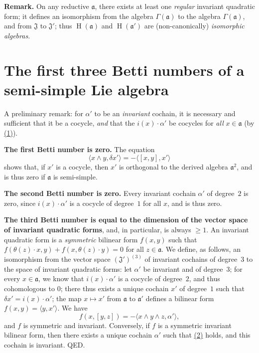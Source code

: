 \documentclass{article}
\newcommand{\fk}{\mathfrak}
\renewcommand{\geq}{\geqslant}
\DeclareMathOperator{\HH}{H}
\newcommand{\oldpage}[1]{\marginpar{\footnotesize$\Big\vert$ \textit{p.~#1}}}
\begin{document}
\medskip
\textbf{Remark.}
On any reductive $\fk{a}$, there exists at least one \emph{regular} invariant quadratic form;
it defines an isomorphism from the algebra $\Gamma(\fk{a})$ to the algebra $\Gamma(\fk{a})$, and from $\fk{J}$ to $\fk{J}'$;
thus $\HH(\fk{a})$ and $\HH(\fk{a}')$ are (non-canonically) \emph{isomorphic algebras}.


\section{The first three Betti numbers of a semi-simple Lie algebra}
\label{II.5}

A preliminary remark:
for $\alpha'$ to be an \emph{invariant} cochain, it is necessary and sufficient that it be a cocycle, \emph{and} that the $i(x)\cdot\alpha'$ be cocycles for \emph{all} $x\in\fk{a}$ (by \hyperref[equation-II.1]{(1)}).

\medskip
\textbf{The first Betti number is zero.}
The equation
\[
  \langle x\wedge y,\delta x'\rangle
  = -\langle[x,y],x'\rangle
\]
shows that, if $x'$ is a cocycle, then $x'$ is orthogonal to the derived algebra $\fk{a}^2$, and is thus zero if $\fk{a}$ is semi-simple.

\medskip
\textbf{The second Betti number is zero.}
Every invariant cochain $\alpha'$ of degree~$2$ is zero, since $i(x)\cdot\alpha'$ is a cocycle of degree~$1$ for all $x$, and is thus zero.

\medskip
\textbf{The third Betti number is equal to the dimension of the vector space of invariant quadratic forms}, and, in particular, is always $\geq1$.
An invariant quadratic form is a \emph{symmetric} bilinear form $f(x,y)$ such that $f(\theta(z)\cdot x,y)+f(x,\theta(z)\cdot y)=0$ for all $z\in\fk{a}$.
We define, as follows, an isomorphism from the vector space $(\fk{J}')^{(3)}$ of invariant cochains of degree~$3$ to the space of invariant quadratic forms:
let $\alpha'$ be invariant and of degree~$3$;
for every $x\in\fk{a}$, we know that $i(x)\cdot\alpha'$ is a cocycle of degree~$2$, and thus cohomologous to $0$;
there thus exists a unique cochain $x'$ of degree~$1$ such that $\delta x'=i(x)\cdot\alpha'$;
the map $x\mapsto x'$ from $\fk{a}$ to $\fk{a}'$ defines a
\oldpage{49}
bilinear form $f(x,y)=\langle y,x'\rangle$.
We have
\[
\label{equation-II.2}
  f(x,[y,z])
  = -\langle x\wedge y\wedge z,\alpha'\rangle,
\tag{2}
\]
and $f$ is symmetric and invariant.
Conversely, if $f$ is a symmetric invariant bilinear form, then there exists a unique cochain $\alpha'$ such that \hyperref[equation-II.2]{(2)} holds, and this cochain is invariant.
QED.
\end{document}
